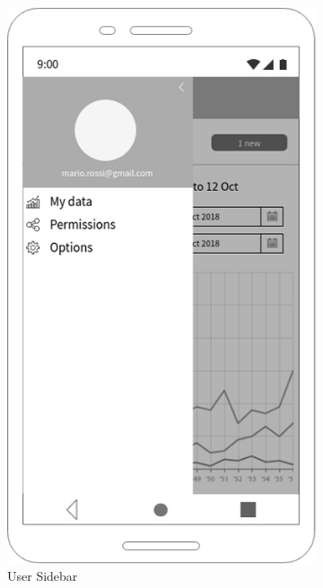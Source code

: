\begin{figure}[h!]

 \centering

  \begin{subfigure}[b]{0.25\linewidth}

    \includegraphics[width=\linewidth]{img/mockup/u_sidebar.jpg}

    \caption{User Sidebar}

  \end{subfigure}
 ~ ~ ~ ~ ~ ~ 
  \begin{subfigure}[b]{0.25\linewidth}


\end{subfigure}
\end{figure}
